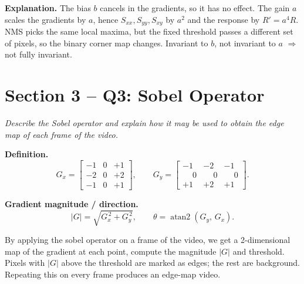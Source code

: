 \documentclass[11pt]{article}
\begin{document}
\medskip
\noindent\textbf{Explanation.}
The bias $b$ cancels in the gradients, so it has no effect. The gain $a$ scales the gradients by $a$, hence $S_{xx}, S_{yy}, S_{xy}$ by $a^2$ and the response by $R' = a^4 R$. NMS picks the same local maxima, but the fixed threshold passes a different set of pixels, so the binary corner map changes. Invariant to $b$, not invariant to $a$ $\Rightarrow$ not fully invariant.
\newpage
\section*{Section 3 -- Q3: Sobel Operator}

\noindent\textit{Describe the Sobel operator and explain how it may be used to
obtain the edge map of each frame of the video.}

\medskip
\noindent\textbf{Definition.}
\[
G_x =
\begin{bmatrix}
-1 & 0 & +1 \\
-2 & 0 & +2 \\
-1 & 0 & +1
\end{bmatrix},
\qquad
G_y =
\begin{bmatrix}
-1 & -2 & -1 \\
\phantom{-}0 & \phantom{-}0 & \phantom{-}0 \\
+1 & +2 & +1
\end{bmatrix}.
\]

\noindent\textbf{Gradient magnitude / direction.}
\[
|G| = \sqrt{G_x^{\,2} + G_y^{\,2}}, \qquad
\theta = \operatorname{atan2}(G_y,\, G_x).
\]

\medskip
By applying the sobel operator on a frame of the video, we get a 2-dimensional map of the gradient at each point, compute the magnitude $|G|$ and threshold. Pixels with $|G|$ above the threshold are marked as edges; the rest are background. Repeating this on every frame produces an edge-map video.
\end{document}
